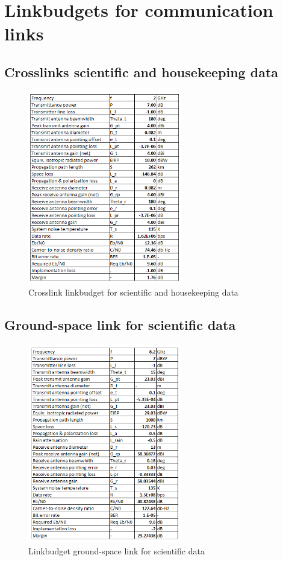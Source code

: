 
\chapter{Linkbudgets for communication links}
\label{linkbudgets}
\section{Crosslinks scientific and housekeeping data}

\begin{figure}[ht]
\centering
\includegraphics[width=0.6\textwidth, angle=0]{img/SSlinkbudget.png}
\caption{Crosslink linkbudget for scientific and housekeeping data}
\label{figSSbudget}
\end{figure}

\section{Ground-space link for scientific data}
\begin{figure}[ht]
\centering
\includegraphics[width=0.6\textwidth, angle=0]{img/GSsciencelinkbudget.png}
\caption{Linkbudget ground-space link for scientific data}
\label{figSSbudget}
\end{figure}

